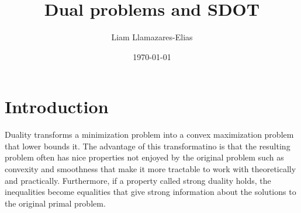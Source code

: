 \documentclass[
    a4paper,
    DIV=13,
    abstract=true,
    numbers=noenddot
]{scrartcl}
\begin{document}
\title{Dual problems and SDOT}
\author{Liam Llamazares-Elias}
\date{\today}
\maketitle


\section{Introduction}

Duality transforms a minimization problem into a convex maximization problem that lower bounds it. The advantage of this transformatino is that the resulting problem often has nice properties not enjoyed by the original problem such as convexity and smoothness that make it more tractable to work with theoretically and practically. Furthermore, if a property called strong duality holds, the inequalities become equalities that give strong information about the solutions to the original primal problem.
\end{document}

